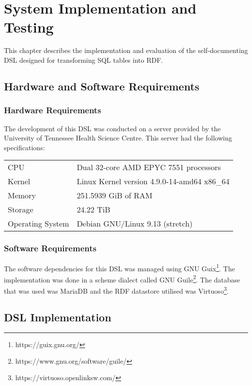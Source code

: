 \chapter{System Implementation and Testing}

This chapter describes the implementation and evaluation of the self-documenting DSL designed for transforming SQL tables into RDF\@.

\section{Hardware and Software Requirements}

\subsection{Hardware Requirements}

The development of this DSL was conducted on a server provided by the University of Tennessee Health Science Centre.  This server had the following specifications:

\begin{center}
\begin{tabular}{ll}
CPU & Dual 32-core AMD EPYC 7551 processors\\
Kernel & Linux Kernel version 4.9.0{-}14{-}amd64 x86\_64\\
Memory & 251.5939 GiB of RAM\\
Storage & 24.22 TiB\\
Operating System & Debian GNU/Linux 9.13 (stretch)\\
\end{tabular}
\end{center}

\subsection{Software Requirements}

The software dependencies for this DSL was managed using GNU Guix\footnote{https://guix.gnu.org/}.  The implementation was done in a scheme dialect called GNU Guile\footnote{https://www.gnu.org/software/guile/}.  The database that was used was MariaDB and the RDF datastore utilised was Virtuoso\footnote{https://virtuoso.openlinksw.com/}.

\section{DSL Implementation}

